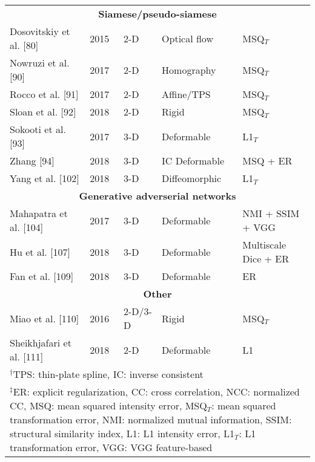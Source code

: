 \begin{table}[!htb]
\begin{tabular*}{\textwidth}{l@{\extracolsep{\fill}}l@{\extracolsep{\fill}}l@{\extracolsep{\fill}}ll}
\midrule
\multicolumn{5}{c}{\textbf{Siamese/pseudo-siamese}}
  \vspace{0.25cm} \\
  Dosovitskiy et al. [80] & 2015 & 2-D & Optical flow & MSQ$_T$ \\ %
  Nowruzi et al. [90] & 2017 & 2-D & Homography & MSQ$_T$ \\
  Rocco et al. [91] & 2017 & 2-D & Affine/TPS & MSQ$_T$ \\
  Sloan et al. [92] & 2018 & 2-D & Rigid & MSQ$_T$ \\  %
  Sokooti et al. [93] & 2017 & 3-D & Deformable & L1$_T$ \\
  Zhang [94] & 2018 & 3-D & IC Deformable & MSQ + ER \\
  Yang et al. [102] & 2018 & 3-D & Diffeomorphic & L1$_T$ \\  %
\midrule
\multicolumn{5}{c}{\textbf{Generative adverserial networks}}
  \vspace{0.25cm} \\
  Mahapatra et al. [104] & 2017 & 3-D & Deformable & NMI + SSIM + VGG \\
  Hu et al. [107] & 2018 & 3-D & Deformable & Multiscale Dice + ER \\
  Fan et al. [109] & 2018 & 3-D & Deformable & ER \\
\midrule
\multicolumn{5}{c}{\textbf{Other}}
  \vspace{0.25cm} \\
  Miao et al. [110] & 2016 & 2-D/3-D & Rigid & MSQ$_T$ \\
  Sheikhjafari et al. [111] & 2018 & 2-D & Deformable & L1 \\
\bottomrule
\multicolumn{5}{l}{
  \begin{minipage}[t]{0.9\columnwidth}%
    \footnotesize{$^\dagger$TPS: thin-plate spline, IC: inverse consistent}
  \end{minipage}
  } \\
\multicolumn{5}{l}{
  \begin{minipage}[t]{0.92\columnwidth}%
    \footnotesize{$^\ddagger$ER:  explicit regularization,
      CC: cross correlation, NCC: normalized CC, MSQ: mean squared intensity error,
      MSQ$_T$: mean squared transformation error,
      NMI:  normalized mutual information, SSIM:  structural similarity index,
      L1:  L1 intensity error,
      L1$_T$: L1 transformation error, VGG: VGG feature-based}
  \end{minipage}
  }
\end{tabular*}
\end{table}


